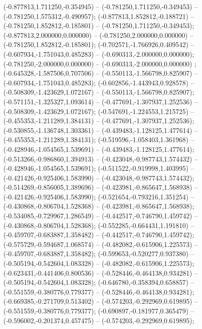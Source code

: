  (-0.877813,1.711250,-0.354945) -- (-0.781250,1.711250,-0.349453) -- (-0.781250,1.575312,-0.490957);
 (-0.877813,1.852812,-0.188721) -- (-0.781250,1.852812,-0.185801) -- (-0.781250,1.711250,-0.349453);
 (-0.877813,2.000000,0.000000) -- (-0.781250,2.000000,0.000000) -- (-0.781250,1.852812,-0.185801);
 (-0.702571,-1.766926,0.409542) -- (-0.607934,-1.751043,0.485283) -- (-0.690313,-2.000000,0.000000);
 (-0.781250,-2.000000,0.000000) -- (-0.690313,-2.000000,0.000000) ;
 (-0.645328,-1.587506,0.707506) -- (-0.550113,-1.566798,0.825907) -- (-0.607934,-1.751043,0.485283);
 (-0.602856,-1.443943,0.928578) -- (-0.508309,-1.423629,1.072167) -- (-0.550113,-1.566798,0.825907);
 (-0.571151,-1.325327,1.093614) -- (-0.477691,-1.307937,1.252536) -- (-0.508309,-1.423629,1.072167);
 (-0.547691,-1.224553,1.215725) -- (-0.455353,-1.211289,1.384131) -- (-0.477691,-1.307937,1.252536);
 (-0.530855,-1.136748,1.303361) -- (-0.439483,-1.128125,1.477614) -- (-0.455353,-1.211289,1.384131);
 (-0.519596,-1.058403,1.361968) -- (-0.428946,-1.054565,1.539691) -- (-0.439483,-1.128125,1.477614);
 (-0.513266,-0.986860,1.394913) -- (-0.423048,-0.987743,1.574432) -- (-0.428946,-1.054565,1.539691);
 (-0.511522,-0.919998,1.403995) -- (-0.421426,-0.925406,1.583990) -- (-0.423048,-0.987743,1.574432);
 (-0.514269,-0.856005,1.389696) -- (-0.423981,-0.865647,1.568938) -- (-0.421426,-0.925406,1.583990);
 (-0.521654,-0.793216,1.351254) -- (-0.430868,-0.806704,1.528368) -- (-0.423981,-0.865647,1.568938);
 (-0.534085,-0.729967,1.286549) -- (-0.442517,-0.746790,1.459742) -- (-0.430868,-0.806704,1.528368);
 (-0.552285,-0.664431,1.191810) -- (-0.459707,-0.683887,1.358482) -- (-0.442517,-0.746790,1.459742);
 (-0.575729,-0.594687,1.068574) -- (-0.482082,-0.615906,1.225573) -- (-0.459707,-0.683887,1.358482);
 (-0.599653,-0.520277,0.937380) -- (-0.505194,-0.542604,1.083328) -- (-0.482082,-0.615906,1.225573);
 (-0.623431,-0.441406,0.800536) -- (-0.528446,-0.464138,0.934281) -- (-0.505194,-0.542604,1.083328);
 (-0.646780,-0.358394,0.658857) -- (-0.551559,-0.380776,0.779377) -- (-0.528446,-0.464138,0.934281);
 (-0.669385,-0.271709,0.513402) -- (-0.574203,-0.292969,0.619895) -- (-0.551559,-0.380776,0.779377);
 (-0.690897,-0.181977,0.365479) -- (-0.596002,-0.201374,0.457475) -- (-0.574203,-0.292969,0.619895);
